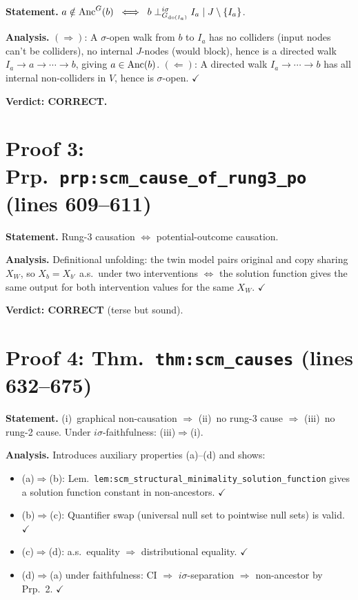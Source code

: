 \documentclass{article}
\begin{document}
\textbf{Statement.}
$a\notin\mathrm{Anc}^G(b) \;\iff\; b\perp^{i\sigma}_{G_{\operatorname{do}(I_a)}} I_a\mid J\setminus\{I_a\}$.

\textbf{Analysis.}
$(\Rightarrow)$: A $\sigma$-open walk from $b$ to $I_a$ has no colliders
(input nodes can't be colliders), no internal $J$-nodes (would block), hence
is a directed walk $I_a\to a\to\cdots\to b$, giving $a\in\mathrm{Anc}(b)$.
$(\Leftarrow)$: A directed walk $I_a\to\cdots\to b$ has all internal
non-colliders in $V$, hence is $\sigma$-open.  $\checkmark$

\textbf{Verdict: CORRECT.}

\section{Proof 3: Prp.\ \texttt{prp:scm\_cause\_of\_rung3\_po} (lines 609--611)}

\textbf{Statement.} Rung-3 causation $\iff$ potential-outcome causation.

\textbf{Analysis.} Definitional unfolding: the twin model pairs original and
copy sharing $X_W$, so $X_b=X_{b'}$ a.s.\ under two interventions $\iff$
the solution function gives the same output for both intervention values for
the same $X_W$.  $\checkmark$

\textbf{Verdict: CORRECT} (terse but sound).

\section{Proof 4: Thm.\ \texttt{thm:scm\_causes} (lines 632--675)}

\textbf{Statement.}
(i)~graphical non-causation $\Rightarrow$ (ii)~no rung-3 cause $\Rightarrow$
(iii)~no rung-2 cause.  Under $i\sigma$-faithfulness: (iii)$\Rightarrow$(i).

\textbf{Analysis.}
Introduces auxiliary properties (a)--(d) and shows:
\begin{itemize}
  \item (a)$\Rightarrow$(b): Lem.\ \texttt{lem:scm\_structural\_minimality\_solution\_function}
    gives a solution function constant in non-ancestors.  $\checkmark$
  \item (b)$\Rightarrow$(c): Quantifier swap (universal null set to
    pointwise null sets) is valid.  $\checkmark$
  \item (c)$\Rightarrow$(d): a.s.\ equality $\Rightarrow$ distributional
    equality.  $\checkmark$
  \item (d)$\Rightarrow$(a) under faithfulness: CI $\Rightarrow$
    $i\sigma$-separation $\Rightarrow$ non-ancestor by Prp.~2.  $\checkmark$
\end{itemize}
\end{document}
